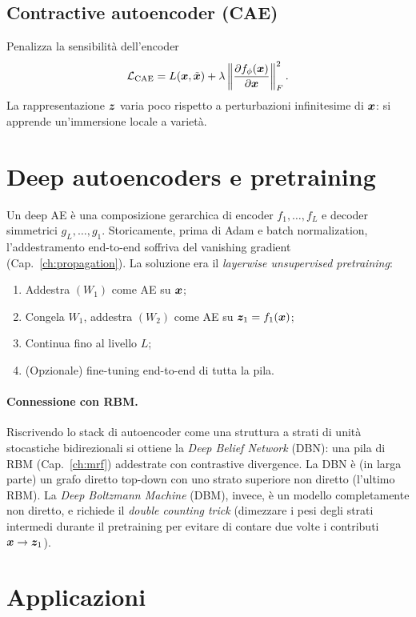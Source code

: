 \subsection{Contractive autoencoder (CAE)}
Penalizza la sensibilità dell'encoder
\[
\mathcal{L}_{\text{CAE}} = L(\bm{x}, \tilde{\bm{x}}) + \lambda \left\| \frac{\partial f_\phi(\bm{x})}{\partial \bm{x}} \right\|_F^2 .
\]
La rappresentazione $\bm{z}$ varia poco rispetto a perturbazioni infinitesime di $\bm{x}$: si apprende un'immersione locale a varietà.

\section{Deep autoencoders e pretraining}

Un deep AE è una composizione gerarchica di encoder $f_1, \dots, f_L$ e decoder simmetrici $g_L, \dots, g_1$. Storicamente, prima di Adam e batch normalization, l'addestramento end-to-end soffriva del vanishing gradient (Cap.~\ref{ch:propagation}). La soluzione era il \emph{layerwise unsupervised pretraining}:
\begin{enumerate}
  \item Addestra $(W_1)$ come AE su $\bm{x}$;
  \item Congela $W_1$, addestra $(W_2)$ come AE su $\bm{z}_1 = f_1(\bm{x})$;
  \item Continua fino al livello $L$;
  \item (Opzionale) fine-tuning end-to-end di tutta la pila.
\end{enumerate}

\paragraph{Connessione con RBM.}
Riscrivendo lo stack di autoencoder come una struttura a strati di unità stocastiche bidirezionali si ottiene la \emph{Deep Belief Network} (DBN): una pila di RBM (Cap.~\ref{ch:mrf}) addestrate con contrastive divergence. La DBN è (in larga parte) un grafo diretto top-down con uno strato superiore non diretto (l'ultimo RBM). La \emph{Deep Boltzmann Machine} (DBM), invece, è un modello completamente non diretto, e richiede il \emph{double counting trick} (dimezzare i pesi degli strati intermedi durante il pretraining per evitare di contare due volte i contributi $\bm{x} \to \bm{z}_1$).

\section{Applicazioni}

